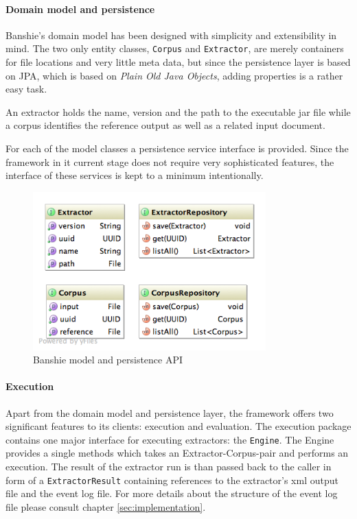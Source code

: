 \paragraph{Domain model and persistence}
Banshie's domain model has been designed with simplicity and extensibility in mind. The two only entity classes, \texttt{Corpus} and \texttt{Extractor}, are merely containers for file locations and very little meta data, but since the persistence layer is based on \gls{JPA}, which is based on \textit{Plain Old Java Objects}, adding properties is a rather easy task.

An extractor holds the name, version and the path to the executable jar file while a corpus identifies the reference output as well as a related input document.

For each of the model classes a persistence service interface is provided. Since the framework in it current stage does not require very sophisticated features, the interface of these services is kept to a minimum intentionally.

\begin{figure}[H]
\centering
\includegraphics[width=0.8\textwidth, trim=20px 20px 0 0, clip=true]{api-model.png}
\caption{Banshie model and persistence API}
\end{figure}

\newpage
\paragraph{Execution}
Apart from the domain model and persistence layer, the framework offers two significant features to its clients: execution and evaluation. The execution package contains one major interface for executing extractors: the \texttt{Engine}. The Engine provides a single methods which takes an Extractor-Corpus-pair and performs an execution. The result of the extractor run is than passed back to the caller in form of a \texttt{ExtractorResult} containing references to the extractor's xml output file and the event log file. For more details about the structure of the event log file please consult chapter \ref{sec:implementation}.

